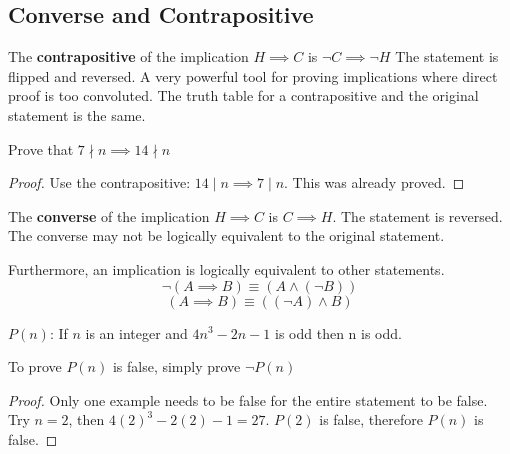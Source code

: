 \documentclass[english, 12pt]{article}
\begin{document}
\subsection{Converse and Contrapositive}
\begin{defn}
The \textbf{contrapositive} of the implication $H \implies C$ is $\lnot C \implies \lnot H$ The statement is flipped and reversed. A very powerful tool for proving implications where direct proof is too convoluted. The truth table for a contrapositive and the original statement is the same.
\end{defn}
\begin{exmp}
Prove that $7 \nmid n \implies 14 \nmid n$
\begin{proof}
Use the contrapositive: $14 \mid n \implies 7 \mid n$. This was already proved. 
\end{proof}
\end{exmp}
\begin{defn}
The \textbf{converse} of the implication $H \implies C$ is $C \implies H$. The statement is reversed. The converse may not be logically equivalent to the original statement.
\end{defn}
\begin{thrm}
Furthermore, an implication is logically equivalent to other statements.
\[ \lnot(A \implies B) \equiv (A \land (\lnot B)) \]
\[ (A \implies B) \equiv ((\lnot A) \land B) \]
\end{thrm}
\begin{exmp}
$P(n)$: If $n$ is an integer and $4n^3 - 2n - 1$ is odd then n is odd.
\begin{note}
To prove $P(n)$ is false, simply prove $\lnot P(n)$
\end{note}
\begin{proof}
Only one example needs to be false for the entire statement to be false. Try $ n = 2$, then $4(2)^3 - 2(2) - 1 = 27$. $P(2)$ is false, therefore $P(n)$ is false.
\end{proof}
\end{exmp}
\end{document}
